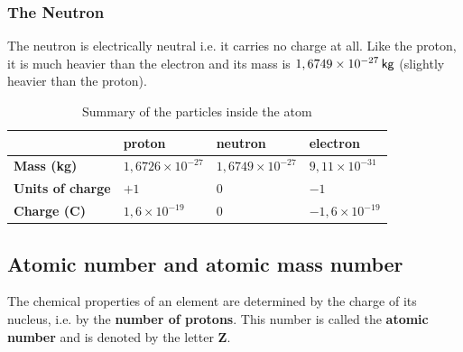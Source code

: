             \subsubsection*{The Neutron}
            \nopagebreak
          \label{m38745*id254468}The neutron is electrically neutral i.e. it carries no charge at all.
Like the proton, it is much heavier than the electron and its mass is $1,6749\ensuremath{\times}{10}^{-27}\phantom{\rule{2pt}{0ex}}\mathsf{kg}$ (slightly heavier than the proton).\par 
\label{m38745*notfhsst!!!underscore!!!id214}
          \begin{table}[H]
        \begin{center}
      \label{m38745*uid14}
    \noindent
      \begin{tabular}{|l|l|l|l|}\hline
         &
                    \textbf{proton}
                   &
                    \textbf{neutron}
                   &
                    \textbf{electron} \\ \hline
                    \textbf{Mass (kg)}
                   &
        $1,6726\ensuremath{\times}{10}^{-27}$ &
        $1,6749\ensuremath{\times}{10}^{-27}$ &
        $9,11\ensuremath{\times}{10}^{-31}$ \\ \hline
                    \textbf{Units of charge}
                   &
        $+1$ &
        $0$ &
        $-1$ \\ \hline
                    \textbf{Charge (C)}
                   &
        $1,6\ensuremath{\times}{10}^{-19}$ &
        $0$ &
        $-1,6\ensuremath{\times}{10}^{-19}$ \\ \hline
    \end{tabular}
      \end{center}
    \caption{Summary of the particles inside the atom}
\end{table}
    \par
    \label{m38745*cid5}
            \subsection*{Atomic number and atomic mass number}
            \nopagebreak
      \label{m38745*id255805}The chemical properties of an element are determined by the charge of
its nucleus, i.e. by the \textbf{number of protons}. This number is
called the \textbf{atomic number} and is denoted by the letter \textbf{Z}.\par 


